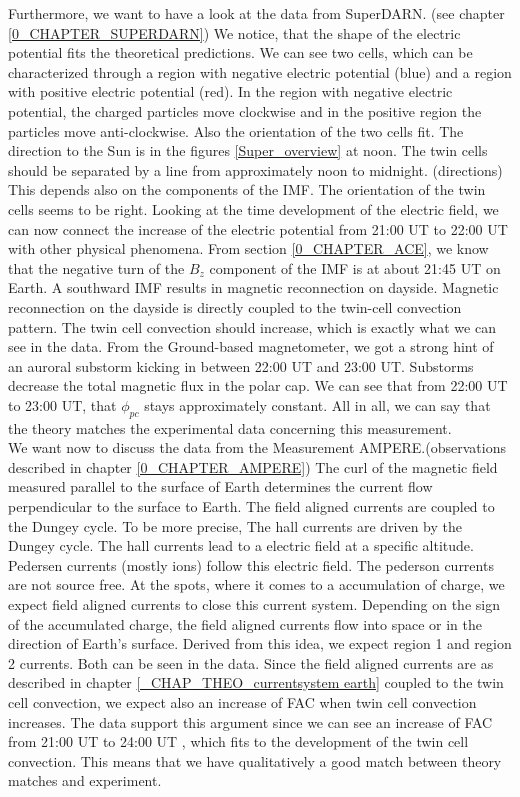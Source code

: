\documentclass[10pt,a4paper]{article}
\begin{document}
Furthermore, we want to have a look at the data from SuperDARN. (see chapter \ref{0_CHAPTER_SUPERDARN}) We notice, that the shape of the electric potential fits the theoretical predictions. We can see two cells, which can be characterized through a region with negative electric potential (blue) and a region with positive electric potential (red). In the region with negative electric potential, the charged particles move clockwise and in the positive region the particles move anti-clockwise. 
Also the orientation of the two cells fit. The direction to the Sun is in the figures \ref{Super_overview} at noon.
The twin cells should be separated by a line from approximately  noon to midnight. (directions) This depends also on the components of the IMF. The orientation of the twin cells seems to be right.  
Looking at the time development of the electric field, we can now connect the increase of the electric potential from 21:00 UT to 22:00 UT with other physical phenomena. 
From section \ref{0_CHAPTER_ACE}, we know that the negative turn of the $B_z$ component of the IMF is at about 21:45 UT on Earth. A southward IMF results in magnetic reconnection on dayside. Magnetic reconnection on the dayside is directly coupled to the twin-cell convection pattern. The twin cell convection should increase, which is exactly what we can see in the data. From the Ground-based magnetometer, we got a strong  hint of an auroral substorm kicking in between 22:00 UT and 23:00 UT. Substorms decrease the total magnetic flux in the polar cap. We can see that from 22:00 UT to 23:00 UT, that $\phi_{pc}$ stays approximately constant.
All in all, we can say that the theory matches the experimental data concerning this measurement.\\ 
We want now to discuss the data from the Measurement AMPERE.(observations described in chapter \ref{0_CHAPTER_AMPERE}) The  curl of the magnetic field measured parallel 
to the surface of Earth determines the current flow perpendicular to the surface to Earth. The field aligned currents are coupled to the Dungey cycle. To be more precise, The hall currents are driven by the Dungey cycle. The hall currents lead to a electric field at a specific altitude. Pedersen currents (mostly ions) follow this electric field. The pederson currents are not source free. At the spots, where it comes to a accumulation of charge, we expect field aligned currents to close this current system. Depending on the sign of the accumulated charge, the field aligned currents flow into space or in the direction of Earth's surface. 
Derived from this idea, we expect region 1 and region 2 currents. Both can be seen in the data. Since the field aligned currents are as described in chapter \ref{_CHAP_THEO_currentsystem earth} coupled to the twin cell convection, we expect also an increase of FAC when twin cell convection increases. The data support this argument since we can see an increase of FAC from 21:00 UT to 24:00 UT , which fits to the development of the twin cell convection. 
This means that we have qualitatively a good match between theory matches and experiment.
\end{document}

